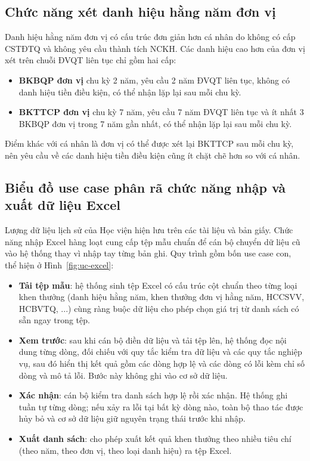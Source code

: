 \documentclass[../DoAn.tex]{subfiles}
\begin{document}
\subsection{Chức năng xét danh hiệu hằng năm đơn vị}
\label{subsection:2.2.6}

Danh hiệu hằng năm đơn vị có cấu trúc đơn giản hơn cá nhân do không có cấp CSTĐTQ và không yêu cầu thành tích NCKH.
Các danh hiệu cao hơn của đơn vị xét trên chuỗi ĐVQT liên tục chỉ gồm hai cấp:

\begin{itemize}
    \item \textbf{BKBQP đơn vị} chu kỳ 2 năm, yêu cầu 2 năm ĐVQT liên tục, không có danh hiệu tiền điều kiện, có thể nhận lặp lại sau mỗi chu kỳ.
    \item \textbf{BKTTCP đơn vị} chu kỳ 7 năm, yêu cầu 7 năm ĐVQT liên tục và ít nhất 3 BKBQP đơn vị trong 7 năm gần nhất, có thể nhận lặp lại sau mỗi chu kỳ.
\end{itemize}

Điểm khác với cá nhân là đơn vị có thể được xét lại BKTTCP sau mỗi chu kỳ, nên yêu cầu về các danh hiệu tiền điều kiện cũng ít chặt chẽ hơn so với cá nhân.

\subsection{Biểu đồ use case phân rã chức năng nhập và xuất dữ liệu Excel}
\label{subsection:2.2.7}

Lượng dữ liệu lịch sử của Học viện hiện lưu trên các tài liệu và bản giấy.
Chức năng nhập Excel hàng loạt cung cấp tệp mẫu chuẩn để cán bộ chuyển dữ liệu cũ vào hệ thống thay vì nhập tay từng bản ghi.
Quy trình gồm bốn use case con, thể hiện ở Hình~\ref{fig:uc-excel}:

\begin{itemize}
    \item \textbf{Tải tệp mẫu}: hệ thống sinh tệp Excel có cấu trúc cột chuẩn theo từng loại khen thưởng (danh hiệu hằng năm, khen thưởng đơn vị hằng năm, HCCSVV, HCBVTQ, ...) cùng ràng buộc dữ liệu cho phép chọn giá trị từ danh sách có sẵn ngay trong tệp.
    \item \textbf{Xem trước}: sau khi cán bộ điền dữ liệu và tải tệp lên, hệ thống đọc nội dung từng dòng, đối chiếu với quy tắc kiểm tra dữ liệu và các quy tắc nghiệp vụ, sau đó hiển thị kết quả gồm các dòng hợp lệ và các dòng có lỗi kèm chỉ số dòng và mô tả lỗi. Bước này không ghi vào cơ sở dữ liệu.
    \item \textbf{Xác nhận}: cán bộ kiểm tra danh sách hợp lệ rồi xác nhận. Hệ thống ghi tuần tự từng dòng; nếu xảy ra lỗi tại bất kỳ dòng nào, toàn bộ thao tác được hủy bỏ và cơ sở dữ liệu giữ nguyên trạng thái trước khi nhập.
    \item \textbf{Xuất danh sách}: cho phép xuất kết quả khen thưởng theo nhiều tiêu chí (theo năm, theo đơn vị, theo loại danh hiệu) ra tệp Excel.
\end{itemize}
\end{document}
